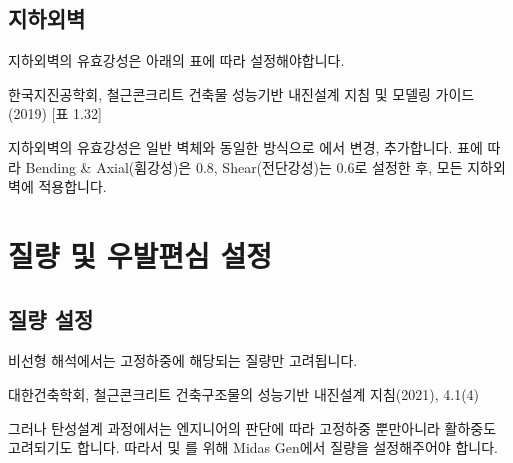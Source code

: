 \documentclass[a4paper,11pt,korean,openany,oneside]{sphinxmanual}
\begin{document}
\subsection{지하외벽}
\label{\detokenize{1_stiffness_setting:id6}}
\sphinxAtStartPar
지하외벽의 유효강성은 아래의 표에 따라 설정해야합니다. %
\begin{footnote}[2]\sphinxAtStartFootnote
한국지진공학회, 철근콘크리트 건축물 성능기반 내진설계 지침 및 모델링 가이드(2019) {[}표 1.3\sphinxhyphen{}2{]}
%
\end{footnote}

\begin{figure}[htbp]
\centering
\capstart

\noindent{}
\caption{}\label{\detokenize{1_stiffness_setting:id11}}\end{figure}

\sphinxAtStartPar
지하외벽의 유효강성은 일반 벽체와 동일한 방식으로 에서 변경, 추가합니다.
표에 따라 Bending \& Axial(휨강성)은 \(0.8\), Shear(전단강성)는 \(0.6\)로 설정한 후, 모든 지하외벽에 적용합니다.

\sphinxstepscope


\section{질량 및 우발편심 설정}
\label{\detokenize{1_mass_ecc_setting:id1}}\label{\detokenize{1_mass_ecc_setting::doc}}

\subsection{질량 설정}
\label{\detokenize{1_mass_ecc_setting:id2}}
\sphinxAtStartPar
비선형 해석에서는 고정하중에 해당되는 질량만 고려됩니다. %
\begin{footnote}[1]\sphinxAtStartFootnote
대한건축학회, 철근콘크리트 건축구조물의 성능기반 내진설계 지침(2021), 4.1\sphinxhyphen{}(4)
%
\end{footnote}
그러나 탄성설계 과정에서는 엔지니어의 판단에 따라 고정하중 뿐만아니라 활하중도 고려되기도 합니다.
따라서  및 를 위해 Midas Gen에서 질량을 설정해주어야 합니다.
\end{document}
